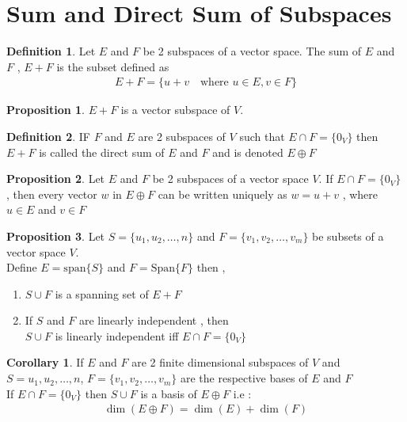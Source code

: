 \documentclass[
12pt,
]{article}
\newcommand{\un}{u_1 , u_2 , \dots , n}
\theoremstyle{definition}
\newtheorem{corollary}{Corollary}[theorem]
\theoremstyle{definition}
\theoremstyle{definition}
\newtheorem{Definition}{Definition}[section]
\theoremstyle{definition}
\newtheorem{Proposition}{Proposition}[section]
\begin{document}
\section{Sum and Direct Sum of Subspaces} 
\begin{Definition}
	Let $E$ and $F$ be 2 subspaces of a vector space. The sum of $E$ and $F$ , $E + F$ is the subset defined as 
	\begin{gather*}
		E + F = \{u+v \quad \text{where } u\in E, v\in F\}
	\end{gather*}
\end{Definition}
\begin{Proposition}
	$E+F$ is a vector subspace of $V$.
\end{Proposition}
\begin{Definition}
	IF $F$ and $E$ are 2 subspaces of $V$ such that $ E \cap F = \{0_V\}$ then $E+F$ is called the direct sum of $E$ and $F$ and is denoted $E \oplus F$
\end{Definition}
\begin{Proposition}
	Let $E$ and $F$ be 2 subspaces of a vector space $V$. If $E \cap F = \{ 0_V \}$ , then every vector $w$ in $E \oplus F$ can be written uniquely as $w = u +v$ , where $u \in E$ and $v \in F$
\end{Proposition}
\begin{Proposition}
	Let $S = \{\un\}$ and $F = \{v_1, v_2 ,\dots, v_m\}$ be subsets of a vector space $V$. \\ 
	Define $E = \text{span} \{S\}$ and $F = \text{Span} \{F\}$ then ,\\
	\begin{enumerate}
		\item $S \cup F$ is a spanning set of $E + F$ 
		\item If $S$ and $F$ are linearly independent , then \\
		$S \cup F$ is linearly independent iff $E \cap F = \{0_V\}$
	\end{enumerate}
\end{Proposition}
\begin{corollary}
	If $E$ and $F$ are 2 finite dimensional subspaces of $V$ and $S = \un$,  $ F = \{v_1, v_2, \dots ,v_m\}$ are the respective bases of $E$ and $F$ \\ 
	If $E \cap F = \{0_V\}$ then $S \cup F$ is a basis of $E \oplus F$ i.e : 
	\begin{gather*}
		\dim(E \oplus F) = \dim(E) + \dim(F)
	\end{gather*}
\end{corollary}
\end{document}
